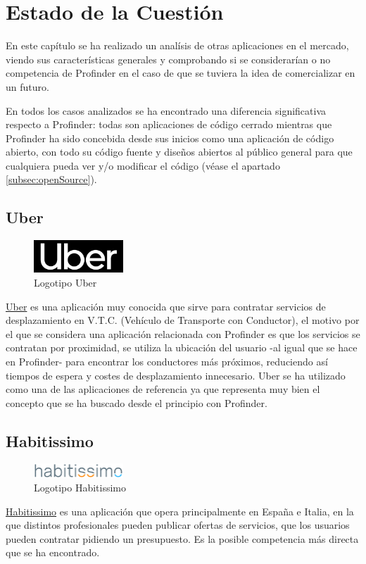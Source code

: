 \chapter{Estado de la Cuestión}
\label{cap:estadoDeLaCuestion}
En este capítulo se ha realizado un analísis de otras aplicaciones en el mercado, viendo sus características generales y comprobando si se considerarían o no competencia de Profinder en el caso de que se tuviera la idea de comercializar en un futuro. 

En todos los casos analizados se ha encontrado una diferencia significativa respecto a Profinder: todas son aplicaciones de código cerrado mientras que Profinder ha sido concebida desde sus inicios como una aplicación de código abierto, con todo su código fuente y diseños abiertos al público general para que cualquiera pueda ver y/o modificar el código (véase el apartado \ref{subsec:openSource}).
\section{Uber}
\begin{figure}[h]
	\centering
	\includegraphics[width = 0.3\textwidth]{Imagenes/Fuentes/logo_Uber.png}
	\caption{Logotipo Uber}
	\label{fig:uber_logo}
\end{figure}
\href{https://www.uber.com}{Uber} es una aplicación muy conocida que sirve para contratar servicios de desplazamiento en V.T.C. (Vehículo de Transporte con Conductor), el motivo por el que se considera una aplicación relacionada con Profinder es que los servicios se contratan por proximidad, se utiliza la ubicación del usuario -al igual que se hace en Profinder- para encontrar los conductores más próximos, reduciendo así tiempos de espera y costes de desplazamiento innecesario. Uber se ha utilizado como una de las aplicaciones de referencia ya que representa muy bien el concepto que se ha buscado desde el principio con Profinder.
\newpage
\section{Habitissimo}
\begin{figure}[h]
	\centering
	\includegraphics[width = 0.3\textwidth]{Imagenes/Fuentes/habitissimo_logo.jpg}
	\caption{Logotipo Habitissimo}
	\label{fig:habitissimo_logo}
\end{figure}
\href{https://www.habitissimo.es}{Habitissimo} es una aplicación que opera principalmente en España e Italia, en la que distintos profesionales pueden publicar ofertas de servicios, que los usuarios pueden contratar pidiendo un presupuesto. Es la posible competencia más directa que se ha encontrado. 

